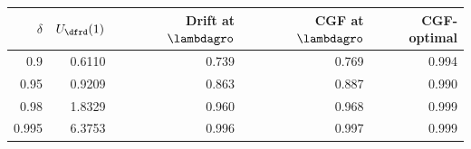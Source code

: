 \begin{tabular}{rrrrr}
\hline
$\delta$ & $U_{\dfrd}(1)$ & Drift at $\lambdagro$ & CGF at $\lambdagro$ & CGF-optimal \\
\hline
0.9 & 0.6110 & 0.739 & 0.769 & 0.994 \\
0.95 & 0.9209 & 0.863 & 0.887 & 0.990 \\
0.98 & 1.8329 & 0.960 & 0.968 & 0.999 \\
0.995 & 6.3753 & 0.996 & 0.997 & 0.999 \\
\hline
\end{tabular}
